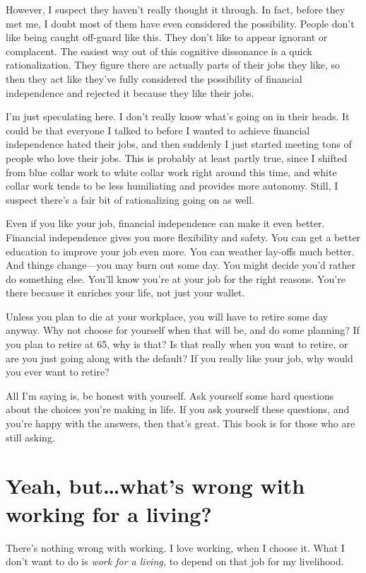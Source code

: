 However, I suspect they haven't really thought it through. In fact, before they met me, I doubt most of them have even considered the possibility. People don't like being caught off-guard like this. They don't like to appear ignorant or complacent. The easiest way out of this cognitive dissonance is a quick rationalization. They figure there are actually parts of their jobs they like, so then they act like they've fully considered the possibility of financial independence and rejected it because they like their jobs.

I'm just speculating here. I don't really know what's going on in their heads. It could be that everyone I talked to before I wanted to achieve financial independence hated their jobs, and then suddenly I just started meeting tons of people who love their jobs. This is probably at least partly true, since I shifted from blue collar work to white collar work right around this time, and white collar work tends to be less humiliating and provides more autonomy. Still, I suspect there's a fair bit of rationalizing going on as well.

Even if you like your job, financial independence can make it even better. Financial independence gives you more flexibility and safety. You can get a better education to improve your job even more. You can weather lay-offs much better. And things change---you may burn out some day. You might decide you'd rather do something else. You'll know you're at your job for the right reasons. You're there because it enriches your life, not just your wallet.

Unless you plan to die at your workplace, you will have to retire some day anyway. Why not choose for yourself when that will be, and do some planning? If you plan to retire at 65, why is that? Is that really when you want to retire, or are you just going along with the default? If you really like your job, why would you ever want to retire?

All I'm saying is, be honest with yourself. Ask yourself some hard questions about the choices you're making in life. If you ask yourself these questions, and you're happy with the answers, then that's great. This book is for those who are still asking.

\section{Yeah, but\ldots what's wrong with working for a living?}
There's nothing wrong with working. I love working, when I choose it. What I don't want to do is \emph{work for a living,} to depend on that job for my livelihood.

